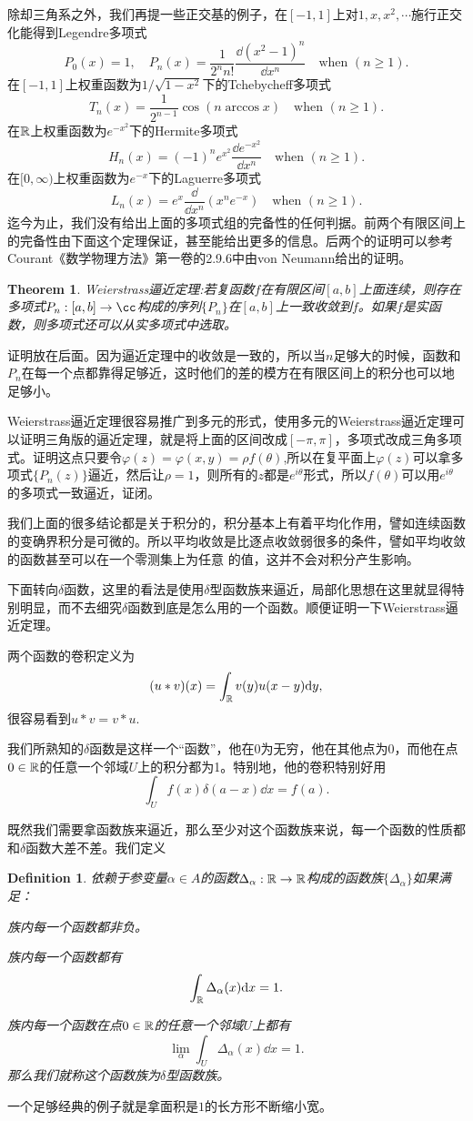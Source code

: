 \documentclass[10pt]{book}
\theoremstyle{plain}%
\newtheorem{defi}{Definition}[chapter]%
\newtheorem{theo}{Theorem}[chapter]%
\begin{document}
除却三角系之外，我们再提一些正交基的例子，在$[-1,1]$上对$1,x,x^2,\cdots$施行正交化能得到Legendre多项式
\[
P_0(x)=1,\quad P_n(x)=\frac{1}{2^n n!}\frac{\dd (x^2-1)^n}{\dd x^n}\quad\text{when} \,\,(n\geq 1).
\]
在$[-1,1]$上权重函数为$1/\sqrt{1-x^2}$下的Tchebycheff多项式
\[
T_n(x)=\frac{1}{2^{n-1}}\cos (n \arccos x)\quad\text{when} \,\,(n\geq 1).
\]
在$\mathbb{R}$上权重函数为$e^{-x^2}$下的Hermite多项式
\[
H_n(x)=(-1)^n e^{x^2} \frac{\dd e^{-x^2}}{\dd x^n}\quad\text{when} \,\,(n\geq 1).
\]
在$[0,\infty)$上权重函数为$e^{-x}$下的Laguerre多项式
\[
L_n(x)=e^{x} \frac{\dd}{\dd x^n}(x^ne^{-x})\quad\text{when} \,\,(n\geq 1).
\]
迄今为止，我们没有给出上面的多项式组的完备性的任何判据。前两个有限区间上的完备性由下面这个定理保证，甚至能给出更多的信息。后两个的证明可以参考Courant《数学物理方法》第一卷的2.9.6中由von Neumann给出的证明。
\begin{theo}
Weierstrass逼近定理:若复函数$f$在有限区间$[a,b]$上面连续，则存在多项式$P_n:[a,b]\to \cc$构成的序列$\{P_n\}$在$[a,b]$上一致收敛到$f$。如果$f$是实函数，则多项式还可以从实多项式中选取。
\end{theo}
证明放在后面。因为逼近定理中的收敛是一致的，所以当$n$足够大的时候，函数和$P_n$在每一个点都靠得足够近，这时他们的差的模方在有限区间上的积分也可以地足够小。

Weierstrass逼近定理很容易推广到多元的形式，使用多元的Weierstrass逼近定理可以证明三角版的逼近定理，就是将上面的区间改成$[-\pi,\pi]$，多项式改成三角多项式。证明这点只要令$\varphi(z)=\varphi(x,y)=\rho f(\theta)$,所以在复平面上$\varphi(z)$可以拿多项式$\{P_n(z)\}$逼近，然后让$\rho=1$，则所有的$z$都是$e^{i\theta}$形式，所以$f(\theta)$可以用$e^{i\theta}$的多项式一致逼近，证闭。

我们上面的很多结论都是关于积分的，积分基本上有着平均化作用，譬如连续函数的变确界积分是可微的。所以平均收敛是比逐点收敛弱很多的条件，譬如平均收敛的函数甚至可以在一个零测集上为任意
的值，这并不会对积分产生影响。

下面转向$\delta$函数，这里的看法是使用$\delta$型函数族来逼近，局部化思想在这里就显得特别明显，而不去细究$\delta$函数到底是怎么用的一个函数。顺便证明一下Weierstrass逼近定理。

两个函数的卷积定义为
\[
	(u*v)(x)=\int_{\mathbb{R}} v(y)u(x-y)\mathrm{d} y,
\]
很容易看到$u*v=v*u$.

我们所熟知的$\delta$函数是这样一个“函数”，他在0为无穷，他在其他点为0，而他在点$0\in \mathbb{R}$的任意一个邻域$U$上的积分都为1。特别地，他的卷积特别好用
\[
\int_U f(x)\delta(a-x) \dd x=f(a).
\]

既然我们需要拿函数族来逼近，那么至少对这个函数族来说，每一个函数的性质都和$\delta$函数大差不差。我们定义
\begin{defi}
依赖于参变量$\alpha\in A$的函数$\Delta_\alpha:\mathbb{R}\to \mathbb{R}$构成的函数族$\{\Delta_\alpha\}$如果满足：

族内每一个函数都非负。

族内每一个函数都有
\[
\int_{\mathbb{R}} \Delta_\alpha(x) \mathrm{d} x=1.
\]

族内每一个函数在点$0\in \mathbb{R}$的任意一个邻域$U$上都有
\[
\lim_{\alpha} \int_U \Delta_\alpha(x) \dd x=1.
\]
那么我们就称这个函数族为$\delta$型函数族。
\end{defi}
一个足够经典的例子就是拿面积是$1$的长方形不断缩小宽。
\end{document}
